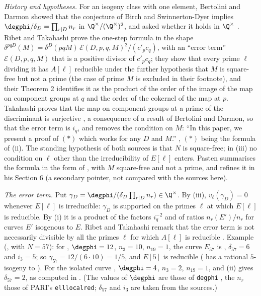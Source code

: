 \begin{remark}\label{rem:moddeg:ribet-takahashi}
\emph{History and hypotheses.} For an isogeny class with one element, Bertolini and Darmon showed that the conjecture of Birch and Swinnerton-Dyer implies $\degphi/\delta_D=\prod_{r\mid D}n_r$ in $\Q^\times/(\Q^\times)^2$, and asked
whether it holds in $\Q^\times$ \cite[page 76]{Takahashi01}. Ribet and Takahashi \cite[Theorem 1]{RibetTakahashi97} prove the one-step formula in the shape
$\delta^{pqD}(M)=\delta^D(pqM)\,\mathcal E(D,p,q,M)^2/(c'_pc_q)$, with an ``error term'' $\mathcal E(D,p,q,M)$ that is a positive divisor of $c'_pc_q$; they show that every prime $\ell$ dividing it has
$A[\ell]$ reducible under the further hypothesis that $M$ is square-free but not a prime (the case of prime $M$ is excluded in their footnote), and their Theorem 2 identifies it as the product of
the order of the image of the map on component groups at $q$ and the order of the cokernel of the map at $p$. Takahashi proves that the map on component groups at a prime of the
discriminant is surjective \cite[Theorem 2.4]{Takahashi01}, a consequence of a result of Bertolini and Darmon, so that the error term is $i_q$, and removes the condition on $M$: ``In this paper,
we present a proof of $(*)$ which works for any $D$ and $M$.'' \cite[page 76]{Takahashi01}, $(*)$ being the formula of (ii). The standing hypothesis of both sources is that $N$ is
square-free; in (iii) no condition on $\ell$ other than the irreducibility of $E[\ell]$ enters. Pasten \cite[Section 1]{Pasten} summarises the formula in the form of \cite{RibetTakahashi97}, with
$M$ square-free and not a prime, and refines it in his Section 6 (a secondary pointer, not compared with the sources here).

\emph{The error term.} Put $\gamma_D=\degphi/(\delta_D\prod_{r\mid D}n_r)\in\Q^\times$. By (iii), $v_\ell(\gamma_D)=0$ whenever $E[\ell]$ is irreducible: $\gamma_D$ is supported on the primes
$\ell$ at which $E[\ell]$ is reducible. By (i) it is a product of the factors $i_q^{-2}$ and of ratios $n_r(E')/n_r$ for curves $E'$ isogenous to $E$. Ribet and Takahashi remark that the error
term is not necessarily divisible by all the primes $\ell$ for which $A[\ell]$ is reducible \cite[page 11111]{RibetTakahashi97}. Example (\cite[Section 4, Example 1 and Table I]{Takahashi01},
with $N=57$): for , $\degphi=12$, $n_3=10$, $n_{19}=1$, the curve $E_{57}$ is , $\delta_{57}=6$ and $i_3=5$; so $\gamma_{57}=12/(6\cdot10)=1/5$, and $E[5]$ is
reducible ( has a rational $5$-isogeny to ). For the isolated curve , $\degphi=4$, $n_3=2$, $n_{19}=1$, and (ii) gives $\delta_{57}=2$, as computed in
\cite[page 11111]{RibetTakahashi97}. (The values of $\degphi$ are those of \texttt{degphi} \cite{ecdata}, the $n_r$ those of PARI's \texttt{elllocalred}; $\delta_{57}$ and $i_3$ are taken from the sources.)


\end{remark}
